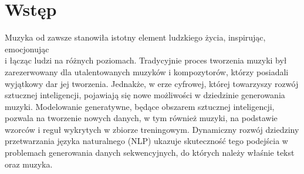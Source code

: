 \documentclass[data-science]{agh-wi} %
\begin{document}
\tableofcontents   %
\newpage
\listoffigures     %
\listoftables      %
\mainmatter %
\chapter{Wstęp}
Muzyka od zawsze stanowiła istotny element ludzkiego życia, inspirując, emocjonując \\i łącząc ludzi na różnych poziomach. Tradycyjnie proces tworzenia muzyki był zarezerwowany dla utalentowanych muzyków i kompozytorów, którzy posiadali wyjątkowy dar jej tworzenia. Jednakże, w erze cyfrowej, której towarzyszy rozwój sztucznej inteligencji, pojawiają się nowe możliwości w dziedzinie generowania muzyki. Modelowanie generatywne, będące obszarem sztucznej inteligencji, pozwala na tworzenie nowych danych, w tym również muzyki, na podstawie wzorców i reguł wykrytych w zbiorze treningowym. Dynamiczny rozwój dziedziny przetwarzania języka naturalnego (NLP) ukazuje skuteczność tego podejścia w problemach generowania danych sekwencyjnych, do których należy właśnie tekst oraz muzyka.
\end{document}
